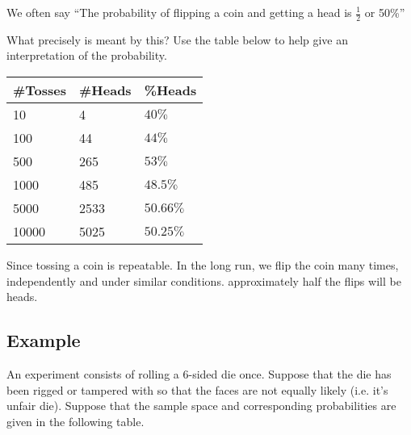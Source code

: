 \documentclass{report}
\begin{document}
\begin{mdframed}
  \vspace{2mm}

We often say ``The probability of flipping a coin and getting a head is $\frac{1}{2}$ or 50\%''
\vspace{3mm}

\noindent What precisely is meant by this? Use the table below to help give an interpretation of the probability.
\bigbreak \noindent
\begin{center}
 \begin{tabular}{lll} 
\#Tosses & \#Heads & \%Heads \\
\hline 10 & 4 & $40 \%$ \\
100 & 44 & $44 \%$ \\
500 & 265 & $53 \%$ \\
1000 & 485 & $48.5 \%$ \\
5000 & 2533 & $50.66 \%$ \\
10000 & 5025 & $50.25 \%$
\end{tabular} 
\end{center}
\vspace{2mm}
\end{mdframed}
Since tossing a coin is repeatable. In the long run, we flip the coin many times, independently and under similar conditions. approximately half the flips will be heads.
\bigbreak \noindent
\subsection*{Example}
An experiment consists of rolling a 6-sided die once. Suppose that the die has been rigged or tampered with so that the faces are not equally likely (i.e. it's unfair die). Suppose that the sample space and corresponding probabilities are given in the following table.
\bigbreak \noindent
\end{document}
